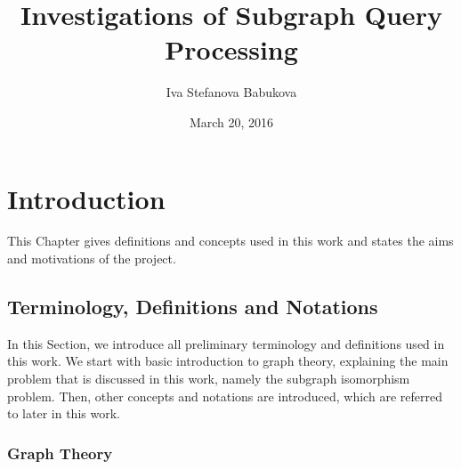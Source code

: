 \documentclass{l4proj}
\newcommand{\Lagr}{\mathcal{L}}
\begin{document}
\title{Investigations of Subgraph Query Processing}
\author{Iva Stefanova Babukova}
\date{March 20, 2016}
\maketitle

\begin{abstract}


\end{abstract}

\educationalconsent
%
%
\tableofcontents
\chapter{Introduction}
\label{ch:introduction}

This Chapter gives definitions and concepts used in this work and states the aims and motivations of the project. 

\section{Terminology, Definitions and Notations}
\label{sec:theory}
In this Section, we introduce all preliminary terminology and definitions used in this work. We start with basic introduction to graph theory, explaining the main problem that is discussed in this work, namely the subgraph isomorphism problem. Then, other concepts and notations are introduced, which are referred to later in this work.

\subsection{Graph Theory}
\label{sec:graphTheory}
\end{document}
